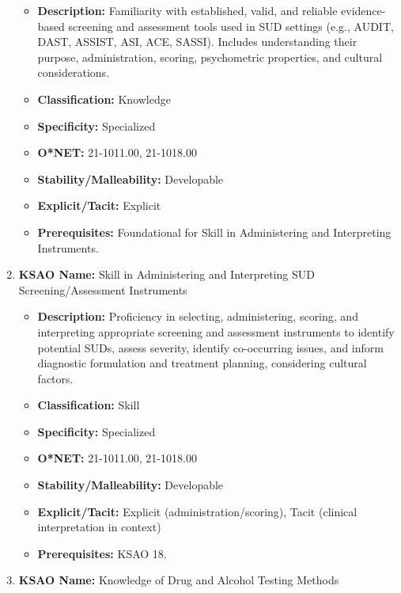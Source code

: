 \documentclass[
  letterpaper,
  DIV=11,
  numbers=noendperiod]{scrartcl}
\providecommand{\tightlist}{%
  \setlength{\itemsep}{0pt}\setlength{\parskip}{0pt}}
\begin{document}
\begin{enumerate}
  \begin{itemize}
  \tightlist
  \item
    \textbf{Description:} Familiarity with established, valid, and
    reliable evidence-based screening and assessment tools used in SUD
    settings (e.g., AUDIT, DAST, ASSIST, ASI, ACE, SASSI). Includes
    understanding their purpose, administration, scoring, psychometric
    properties, and cultural considerations.
  \item
    \textbf{Classification:} Knowledge
  \item
    \textbf{Specificity:} Specialized
  \item
    \textbf{O*NET:} 21-1011.00, 21-1018.00
  \item
    \textbf{Stability/Malleability:} Developable
  \item
    \textbf{Explicit/Tacit:} Explicit
  \item
    \textbf{Prerequisites:} Foundational for Skill in Administering and
    Interpreting Instruments.
  \end{itemize}
\item
  \textbf{KSAO Name:} Skill in Administering and Interpreting SUD
  Screening/Assessment Instruments

  \begin{itemize}
  \tightlist
  \item
    \textbf{Description:} Proficiency in selecting, administering,
    scoring, and interpreting appropriate screening and assessment
    instruments to identify potential SUDs, assess severity, identify
    co-occurring issues, and inform diagnostic formulation and treatment
    planning, considering cultural factors.
  \item
    \textbf{Classification:} Skill
  \item
    \textbf{Specificity:} Specialized
  \item
    \textbf{O*NET:} 21-1011.00, 21-1018.00
  \item
    \textbf{Stability/Malleability:} Developable
  \item
    \textbf{Explicit/Tacit:} Explicit (administration/scoring), Tacit
    (clinical interpretation in context)
  \item
    \textbf{Prerequisites:} KSAO 18.
  \end{itemize}
\item
  \textbf{KSAO Name:} Knowledge of Drug and Alcohol Testing Methods


\end{enumerate}
\end{document}
